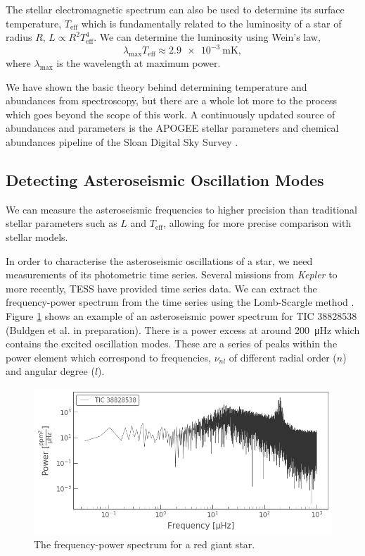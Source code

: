 The stellar electromagnetic spectrum can also be used to determine its surface temperature, $T_\mathrm{eff}$ which is fundamentally related to the luminosity of a star of radius $R$, $L \propto R^2T_\mathrm{eff}^4$. We can determine the luminosity using Wein's law,
\begin{equation}
    \lambda_\mathrm{max} T_\mathrm{eff} \approx \SI{2.9e-3}{\meter\kelvin},
\end{equation}
where $\lambda_\mathrm{max}$ is the wavelength at maximum power.

We have shown the basic theory behind determining temperature and abundances from spectroscopy, but there are a whole lot more to the process which goes beyond the scope of this work. A continuously updated source of abundances and parameters is the APOGEE stellar parameters and chemical abundances pipeline \citep[ASPCAP;][]{GarciaPerez.AllendePrieto.ea2016} of the Sloan Digital Sky Survey \citep[SDSS;][]{Blanton.Bershady.ea2017}.

\subsection{Detecting Asteroseismic Oscillation Modes}\label{sec:astero-obs}

We can measure the asteroseismic frequencies to higher precision than traditional stellar parameters such as $L$ and $T_\mathrm{eff}$, allowing for more precise comparison with stellar models.

In order to characterise the asteroseismic oscillations of a star, we need measurements of its photometric time series. Several missions from \emph{Kepler} \citep{Borucki.Koch.ea2010} to more recently, TESS \citep{Ricker.Winn.ea2015} have provided time series data. We can extract the frequency-power spectrum from the time series using the Lomb-Scargle method \citep{Lomb1976, Scargle1982}. Figure \ref{fig:spec} shows an example of an asteroseismic power spectrum for TIC 38828538 (Buldgen et al. in preparation). There is a power excess at around \SI{200}{\micro\hertz} which contains the excited oscillation modes. These are a series of peaks within the power element which correspond to frequencies, $\nu_{nl}$ of different radial order ($n$) and angular degree ($l$).

\begin{figure}
    \centering
    \includegraphics[width=0.8\linewidth]{introduction/images/sprectrum.png}
    \caption{The frequency-power spectrum for a red giant star.}
    \label{fig:spec}
\end{figure}

